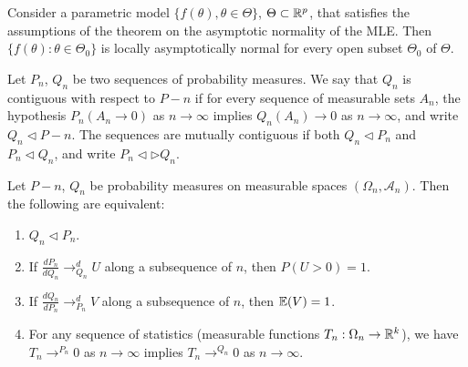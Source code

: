 \begin{thm}
  Consider a parametric model $\{ f(\theta), \theta \in \Theta \} $,
  $\Theta \subset \mathbb{R}^{p}$, that satisfies the assumptions of the
  theorem on the asymptotic normality of the MLE.  Then $\{ f(\theta):
\theta \in \Theta_{0} \} $ is locally asymptotically normal for every
open subset $\Theta_{0}$ of $\Theta$.
\end{thm}

\begin{defn}[Contiguity]
  \label{sec:cons-param-model}
  Let $P_{n}$, $Q_{n}$ be two sequences of probability measures. We
  say that $Q_{n}$ is contiguous with respect to $P-n$ if for every
  sequence of measurable sets $A_{n}$, the hypothesis $P_{n}(A_{n}
  \rightarrow 0)$ as $n \rightarrow \infty$ implies $Q_{n}(A_{n})
  \rightarrow 0$  as $n \rightarrow \infty$, and write $Q_{n}
  \triangleleft P-n$.  The sequences are mutually contiguous if both
  $Q_{n} \triangleleft P_{n}$ and $P_{n} \triangleleft Q_{n}$, and
  write $P_{n} \triangleleft \triangleright Q_{n}$.
\end{defn}

\begin{thm}
  Let $P-n$, $Q_{n}$ be probability measures on measurable spaces
  $(\Omega_{n}, \mathcal{A}_{n})$.  Then the following are equivalent:
  \begin{enumerate}
  \item $Q_{n} \triangleleft P_{n}$.
  \item If $\frac{dP_{n}}{dQ_{n}} \rightarrow^{d}_{Q_{n}} U$ along a
    subsequence of $n$, then $P(U > 0) = 1$.
  \item If $\frac{dQ_{n}}{dP_{n}} \rightarrow^{d}_{P_{n}} V$ along a
    subsequence of $n$, then $\E{V} = 1$.
  \item For any sequence of statistics (measurable functions $T_{n}:
    \Omega_{n} \rightarrow \mathbb{R}^{k}$), we have $T_{n}
    \rightarrow^{P_{n}} 0$ as $n \rightarrow \infty$ implies $T_{n}
    \rightarrow^{Q_{n}} 0$ as $n \rightarrow \infty$.
  \end{enumerate}
\end{thm}


